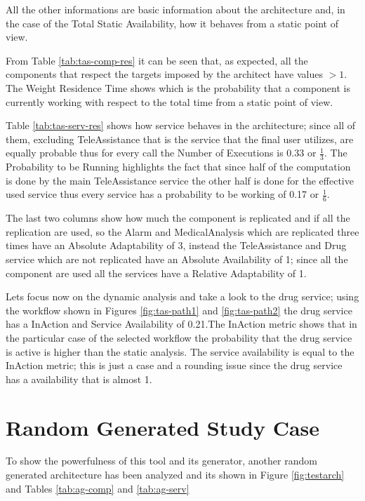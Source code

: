 All the other informations are basic information about the architecture and, in the case of the Total Static Availability, how it behaves from a static point of view.

From Table \ref{tab:tas-comp-res} it can be seen that, as expected, all the components that respect the targets imposed by the architect have values $>1$. The Weight Residence Time shows which is the probability that a component is currently working with respect to the total time from a static point of view.

Table \ref{tab:tas-serv-res} shows how service behaves in the architecture; since all of them, excluding TeleAssistance that is the service that the final user utilizes, are equally probable thus for every call the Number of Executions is 0.33 or $\frac{1}{3}$. The Probability to be Running highlights the fact that since half of the computation is done by the main TeleAssistance service the other half is done for the effective used service thus every service has a probability to be working of 0.17 or $\frac{1}{6}$.

The last two columns show how much the component is replicated and if all the replication are used, so the Alarm and MedicalAnalysis which are replicated three times have an Absolute Adaptability of 3, instead the TeleAssistance and Drug service which are not replicated have an Absolute Availability of 1; since all the component are used all the services have a Relative Adaptability of 1.

Lets focus now on the dynamic analysis and take a look to the drug service; using the workflow shown in Figures \ref{fig:tas-path1} and \ref{fig:tas-path2} the drug service has a InAction and Service Availability of 0.21.The InAction metric shows that in the particular case of the selected workflow the probability that the drug service is active is higher than the static analysis. The service availability is equal to the InAction metric; this is just a case and a rounding issue since the drug service has a availability that is almost 1.
\clearpage

\section{Random Generated Study Case}
To show the powerfulness of this tool and its generator, another random generated architecture has been analyzed and its shown in Figure \ref{fig:testarch} and Tables \ref{tab:ag-comp} and \ref{tab:ag-serv}

